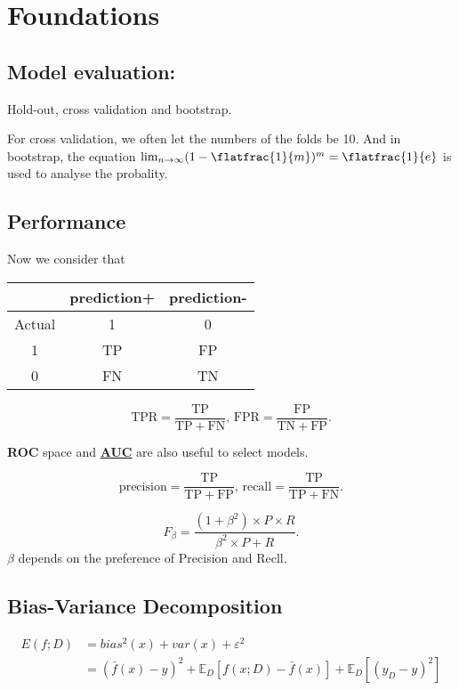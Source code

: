 \section{Foundations}
\subsection{Model evaluation:}
Hold-out, cross validation and bootstrap.

For cross validation, we often let the numbers of the folds be 10. And in bootstrap, the equation $\lim_{n\to\infty}(1-\flatfrac{1}{m})^m=\flatfrac{1}{e}$ is used to analyse the probality.

\subsection{Performance}
\begin{defi}
	Now we consider that
	\begin{table}[H]
		\centering
		\begin{tabular}{c|c|c}
			       & prediction+ & prediction- \\ \hline
			Actual & 1           & 0           \\ \hline
			1      & TP          & FP          \\ \hline
			0      & FN          & TN
		\end{tabular}
	\end{table}
	\[
		\mathrm{TPR}=\frac{\mathrm{TP}}{\mathrm{TP}+\mathrm{FN}},\,
		\mathrm{FPR}=\frac{\mathrm{FP}}{\mathrm{TN}+\mathrm{FP}}
		.\]
\end{defi}
\begin{remark}
	{\textbf{ROC}} space and \href{https://baike.baidu.com/item/AUC/19282953}{\textbf{AUC}} are also useful to select models.

\end{remark}

\begin{defi}
	\[
		\mathrm{precision}=\frac{\mathrm{TP}}{\mathrm{TP}+\mathrm{FP}},\,
		\mathrm{recall}=\frac{\mathrm{TP}}{\mathrm{TP}+\mathrm{FN}}
		.\]
\end{defi}


\[
	F_\beta=\frac{(1+\beta^2)\times P\times R}{\beta^2\times P+R}
	.\]
$\beta$ depends on the preference of Precision and Recll.


\subsection{Bias-Variance Decomposition}
\begin{thm}
	\[
		\begin{aligned}
			E(f; D) & =
			bias^2(x)+var(x)+\varepsilon^2
			\\&=
			(\bar{f}(x)-y)^2+\mathbb{E}_D[f(x; D)-\bar{f}(x)]+\mathbb{E}_D[(y_D-y)^2]
		\end{aligned}
	\]

\end{thm}
